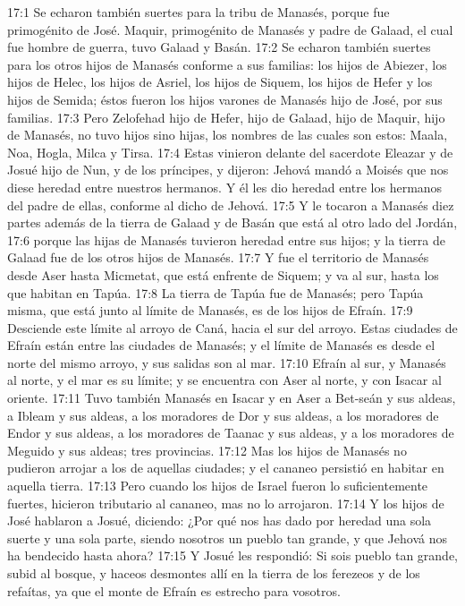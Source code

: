 17:1 Se echaron también suertes para la tribu de Manasés, porque fue primogénito de José. Maquir, primogénito de Manasés y padre de Galaad, el cual fue hombre de guerra, tuvo Galaad y Basán.  
17:2 Se echaron también suertes para los otros hijos de Manasés conforme a sus familias: los hijos de Abiezer, los hijos de Helec, los hijos de Asriel, los hijos de Siquem, los hijos de Hefer y los hijos de Semida; éstos fueron los hijos varones de Manasés hijo de José, por sus familias.  
17:3 Pero Zelofehad hijo de Hefer, hijo de Galaad, hijo de Maquir, hijo de Manasés, no tuvo hijos sino hijas, los nombres de las cuales son estos: Maala, Noa, Hogla, Milca y Tirsa.  
17:4 Estas vinieron delante del sacerdote Eleazar y de Josué hijo de Nun, y de los príncipes, y dijeron: Jehová mandó a Moisés que nos diese heredad entre nuestros hermanos. Y él les dio heredad entre los hermanos del padre de ellas, conforme al dicho de Jehová.  
17:5 Y le tocaron a Manasés diez partes además de la tierra de Galaad y de Basán que está al otro lado del Jordán,  
17:6 porque las hijas de Manasés tuvieron heredad entre sus hijos; y la tierra de Galaad fue de los otros hijos de Manasés.  
17:7 Y fue el territorio de Manasés desde Aser hasta Micmetat, que está enfrente de Siquem; y va al sur, hasta los que habitan en Tapúa.  
17:8 La tierra de Tapúa fue de Manasés; pero Tapúa misma, que está junto al límite de Manasés, es de los hijos de Efraín.  
17:9 Desciende este límite al arroyo de Caná, hacia el sur del arroyo. Estas ciudades de Efraín están entre las ciudades de Manasés; y el límite de Manasés es desde el norte del mismo arroyo, y sus salidas son al mar.  
17:10 Efraín al sur, y Manasés al norte, y el mar es su límite; y se encuentra con Aser al norte, y con Isacar al oriente.  
17:11 Tuvo también Manasés en Isacar y en Aser a Bet-seán y sus aldeas, a Ibleam y sus aldeas, a los moradores de Dor y sus aldeas, a los moradores de Endor y sus aldeas, a los moradores de Taanac y sus aldeas, y a los moradores de Meguido y sus aldeas; tres provincias.  
17:12 Mas los hijos de Manasés no pudieron arrojar a los de aquellas ciudades; y el cananeo persistió en habitar en aquella tierra.  
17:13 Pero cuando los hijos de Israel fueron lo suficientemente fuertes, hicieron tributario al cananeo, mas no lo arrojaron. 
17:14 Y los hijos de José hablaron a Josué, diciendo: ¿Por qué nos has dado por heredad una sola suerte y una sola parte, siendo nosotros un pueblo tan grande, y que Jehová nos ha bendecido hasta ahora?  
17:15 Y Josué les respondió: Si sois pueblo tan grande, subid al bosque, y haceos desmontes allí en la tierra de los ferezeos y de los refaítas, ya que el monte de Efraín es estrecho para vosotros.  
